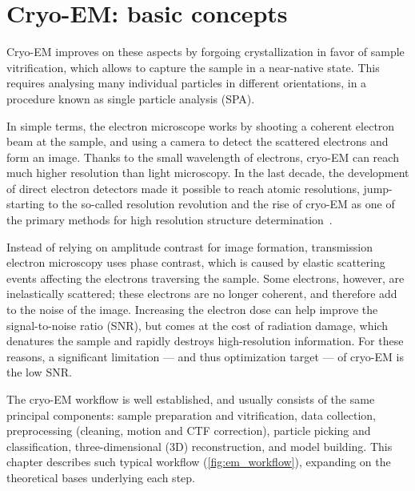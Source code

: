 
\localtableofcontents

\section{Cryo-EM: basic concepts}

Cryo-EM improves on these aspects by forgoing crystallization in favor of sample vitrification, which allows to capture the sample in a near-native state. This requires analysing many individual particles in different orientations, in a procedure known as single particle analysis (SPA).

In simple terms, the electron microscope works by shooting a coherent electron beam at the sample, and using a camera to detect the scattered electrons and form an image.
Thanks to the small wavelength of electrons, cryo-EM can reach much higher resolution than light microscopy.
In the last decade, the development of direct electron detectors made it possible to reach atomic resolutions, jump-starting to the so-called resolution revolution and the rise of cryo-EM as one of the primary methods for high resolution structure determination~\cite{faruqiCCDDetectorsHighresolution2000}.

Instead of relying on amplitude contrast for image formation, transmission electron microscopy uses phase contrast, which is caused by elastic scattering events affecting the electrons traversing the sample.
Some electrons, however, are inelastically scattered; these electrons are no longer coherent, and therefore add to the noise of the image.
Increasing the electron dose can help improve the signal-to-noise ratio (SNR), but comes at the cost of radiation damage, which denatures the sample and rapidly destroys high-resolution information.
For these reasons, a significant limitation --- and thus optimization target --- of cryo-EM is the low SNR.

The cryo-EM workflow is well established, and usually consists of the same principal components: sample preparation and vitrification, data collection, preprocessing (cleaning, motion and CTF correction), particle picking and classification, three-dimensional (3D) reconstruction, and model building.
This chapter describes such typical workflow (\autoref{fig:em_workflow}), expanding on the theoretical bases underlying each step.

